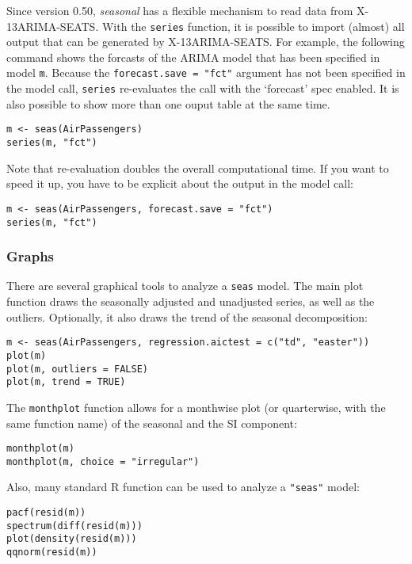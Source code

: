 Since version 0.50, \emph{seasonal} has a flexible mechanism to read
data from X-13ARIMA-SEATS. With the \texttt{series} function, it is
possible to import (almost) all output that can be generated by
X-13ARIMA-SEATS. For example, the following command shows the forcasts
of the ARIMA model that has been specified in model \texttt{m}. Because
the \texttt{forecast.save = "fct"} argument has not been specified in
the model call, \texttt{series} re-evaluates the call with the
`forecast' spec enabled. It is also possible to show more than one ouput
table at the same time.

\begin{verbatim}
m <- seas(AirPassengers)
series(m, "fct")
\end{verbatim}

Note that re-evaluation doubles the overall computational time. If you
want to speed it up, you have to be explicit about the output in the
model call:

\begin{verbatim}
m <- seas(AirPassengers, forecast.save = "fct")
series(m, "fct")
\end{verbatim}

\subsubsection{Graphs}\label{graphs}

There are several graphical tools to analyze a \texttt{seas} model. The
main plot function draws the seasonally adjusted and unadjusted series,
as well as the outliers. Optionally, it also draws the trend of the
seasonal decomposition:

\begin{verbatim}
m <- seas(AirPassengers, regression.aictest = c("td", "easter"))
plot(m)
plot(m, outliers = FALSE)
plot(m, trend = TRUE)
\end{verbatim}

The \texttt{monthplot} function allows for a monthwise plot (or
quarterwise, with the same function name) of the seasonal and the SI
component:

\begin{verbatim}
monthplot(m)
monthplot(m, choice = "irregular")
\end{verbatim}

Also, many standard R function can be used to analyze a \texttt{"seas"}
model:

\begin{verbatim}
pacf(resid(m))
spectrum(diff(resid(m)))
plot(density(resid(m)))
qqnorm(resid(m))
\end{verbatim}

